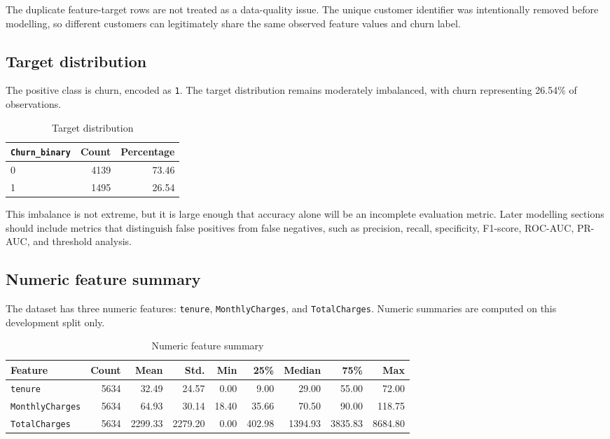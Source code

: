 The duplicate feature-target rows are not treated as a data-quality issue. The unique customer identifier was intentionally removed before modelling, so different customers can legitimately share the same observed feature values and churn label.

\subsection{Target distribution}

The positive class is churn, encoded as \texttt{1}. The target distribution remains moderately imbalanced, with churn representing 26.54\% of observations.

\begin{table}[H]
\centering
\caption{Target distribution}
\begin{tabular}{lrr}
\toprule
\texttt{Churn\_binary} & Count & Percentage \\
\midrule
0 & 4139 & 73.46 \\
1 & 1495 & 26.54 \\
\bottomrule
\end{tabular}
\end{table}

This imbalance is not extreme, but it is large enough that accuracy alone will be an incomplete evaluation metric. Later modelling sections should include metrics that distinguish false positives from false negatives, such as precision, recall, specificity, F1-score, ROC-AUC, PR-AUC, and threshold analysis.

\subsection{Numeric feature summary}

The dataset has three numeric features: \texttt{tenure}, \texttt{MonthlyCharges}, and \texttt{TotalCharges}. Numeric summaries are computed on this development split only.

\begin{table}[H]
\centering
\caption{Numeric feature summary}
\begin{tabular}{lrrrrrrrr}
\toprule
Feature & Count & Mean & Std. & Min & 25\% & Median & 75\% & Max \\
\midrule
\texttt{tenure} & 5634 & 32.49 & 24.57 & 0.00 & 9.00 & 29.00 & 55.00 & 72.00 \\
\texttt{MonthlyCharges} & 5634 & 64.93 & 30.14 & 18.40 & 35.66 & 70.50 & 90.00 & 118.75 \\
\texttt{TotalCharges} & 5634 & 2299.33 & 2279.20 & 0.00 & 402.98 & 1394.93 & 3835.83 & 8684.80 \\
\bottomrule
\end{tabular}
\end{table}

